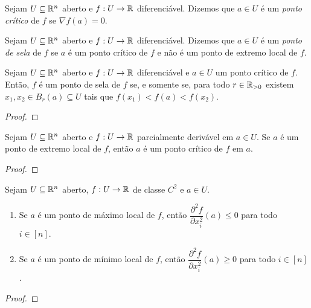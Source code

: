 \begin{definition}
    Sejam $U \subseteq \mathbb{R}^n$ aberto e $f : U \to \mathbb{R}$ diferenciável. Dizemos que $a \in U$ é um \emph{ponto crítico} de $f$ se $\nabla f(a) = 0$.
\end{definition}

\begin{definition}
    Sejam $U \subseteq \mathbb{R}^n$ aberto e $f : U \to \mathbb{R}$ diferenciável. Dizemos que $a \in U$ é um \emph{ponto de sela} de $f$ se $a$ é um ponto crítico de $f$ e não é um ponto de extremo local de $f$.
\end{definition}

\begin{proposition}
    Sejam $U \subseteq \mathbb{R}^n$ aberto e $f : U \to \mathbb{R}$ diferenciável e $a \in U$ um ponto crítico de $f$. Então, $f$ é um ponto de sela de $f$ se, e somente se, para todo $r \in \mathbb{R}_{>0}$ existem $x_1, x_2 \in B_r(a) \subseteq U$ tais que $f(x_1) < f(a) < f(x_2)$.
\end{proposition}

\begin{proof}
    \blackproof
\end{proof}

\begin{proposition}
    Sejam $U \subseteq \mathbb{R}^n$ aberto e $f : U \to \mathbb{R}$ parcialmente derivável em $a \in U$. Se $a$ é um ponto de extremo local de $f$, então $a$ é um ponto crítico de $f$ em $a$.
\end{proposition}

\begin{proof}
    \blackproof
\end{proof}

\begin{proposition}
    Sejam $U \subseteq \mathbb{R}^n$ aberto, $f : U \to \mathbb{R}$ de classe $C^2$ e $a \in U$. 
        \begin{enumerate}[leftmargin=*, align=left, label=\textbf{(\alph*)}]
            \item Se $a$ é um ponto de máximo local de $f$, então $\dfrac{\partial^2 f}{\partial x_i^2}(a) \leq 0$ para todo $i \in [n]$.
            \item Se $a$ é um ponto de mínimo local de $f$, então $\dfrac{\partial^2 f}{\partial x_i^2}(a) \geq 0$ para todo $i \in [n]$.
        \end{enumerate}
\end{proposition}

\begin{proof}
    \blackproof
\end{proof}

